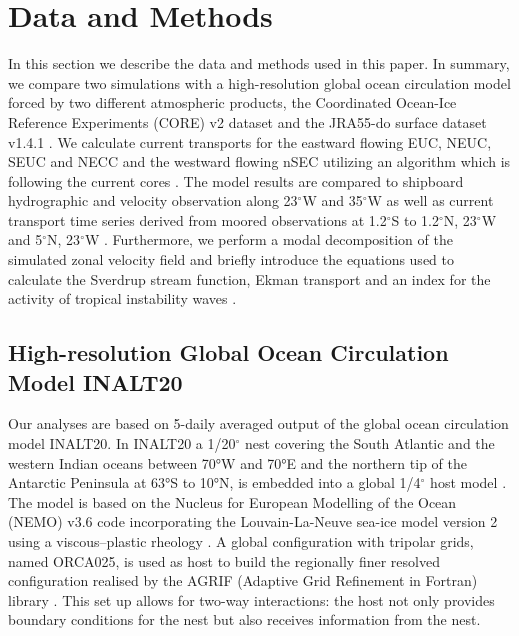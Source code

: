 \documentclass[os, manuscript]{copernicus}
\begin{document}
	\section{Data and Methods}
	In this section we describe the data and methods used in this paper. In summary, we compare two simulations with a high-resolution global ocean circulation model forced by two different atmospheric products, the Coordinated Ocean-Ice Reference Experiments (CORE) v2 dataset \citep{Griffies2009} and the JRA55-do surface dataset v1.4.1 \citep{Tsujino2018}. We calculate current transports for the eastward flowing EUC, NEUC, SEUC and NECC and the westward flowing nSEC utilizing an algorithm which is following the current cores \citep{Hsin2012,Burmeister2019}. The model results are compared to shipboard hydrographic and velocity observation along 23$^{\circ}$W \citep[e.g.][]{Brandt2015,Hahn2017,Burmeister2020} and 35$^{\circ}$W \citep{Hormann2007,Tuchen2022} as well as current transport time series derived from moored observations at 1.2$^{\circ}$S to 1.2$^{\circ}$N, 23$^{\circ}$W \citep{Brandt2021a} and 5$^{\circ}$N, 23$^{\circ}$W \citep{Burmeister2020}. Furthermore, we perform a modal decomposition of the simulated zonal velocity field and briefly introduce the equations used to calculate the Sverdrup stream function, Ekman transport and an index for the activity of tropical instability waves \citep{Lee2014, Olivier2020, Perez2012,Tuchen2022a}.
	
	\subsection{High-resolution Global Ocean Circulation Model INALT20}
	Our analyses are based on 5-daily averaged output of the global ocean circulation model INALT20. In INALT20 a 1/20$^{\circ}$ nest covering the South Atlantic and the western Indian oceans
	between 70°W and 70°E and the northern tip of the Antarctic Peninsula at 63°S to 10°N, is embedded into a global 1/4$^{\circ}$ host model \citep{Schwarzkopf2019}. The model is based on the Nucleus for European Modelling of the Ocean (NEMO) v3.6 code \citep{Madec2016} incorporating the Louvain-La-Neuve sea-ice model version 2 using a viscous–plastic rheology \citep[LIM2-VP;][]{Fichefet1997}. A global configuration with tripolar grids, named ORCA025, is used as host to build the regionally finer resolved configuration realised by the AGRIF (Adaptive Grid Refinement in Fortran) library \citep{Debreu2008}. This set up allows for two-way interactions: the host not only provides boundary conditions for the nest but also receives information from the nest.
	
\end{document}
